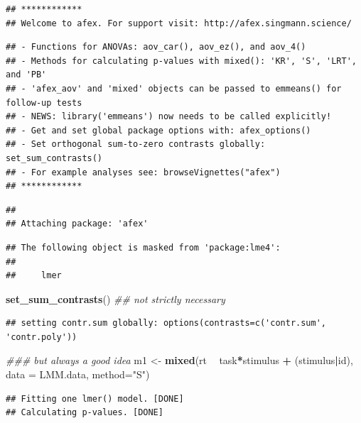 \documentclass[
]{book}
\newenvironment{Shaded}{\begin{snugshade}}{\end{snugshade}}
\newcommand{\CommentTok}[1]{\textcolor[rgb]{0.56,0.35,0.01}{\textit{#1}}}
\newcommand{\DataTypeTok}[1]{\textcolor[rgb]{0.13,0.29,0.53}{#1}}
\newcommand{\KeywordTok}[1]{\textcolor[rgb]{0.13,0.29,0.53}{\textbf{#1}}}
\newcommand{\NormalTok}[1]{#1}
\newcommand{\OperatorTok}[1]{\textcolor[rgb]{0.81,0.36,0.00}{\textbf{#1}}}
\newcommand{\StringTok}[1]{\textcolor[rgb]{0.31,0.60,0.02}{#1}}
\begin{document}
\begin{verbatim}
## ************
## Welcome to afex. For support visit: http://afex.singmann.science/
\end{verbatim}

\begin{verbatim}
## - Functions for ANOVAs: aov_car(), aov_ez(), and aov_4()
## - Methods for calculating p-values with mixed(): 'KR', 'S', 'LRT', and 'PB'
## - 'afex_aov' and 'mixed' objects can be passed to emmeans() for follow-up tests
## - NEWS: library('emmeans') now needs to be called explicitly!
## - Get and set global package options with: afex_options()
## - Set orthogonal sum-to-zero contrasts globally: set_sum_contrasts()
## - For example analyses see: browseVignettes("afex")
## ************
\end{verbatim}

\begin{verbatim}
## 
## Attaching package: 'afex'
\end{verbatim}

\begin{verbatim}
## The following object is masked from 'package:lme4':
## 
##     lmer
\end{verbatim}

\begin{Shaded}
\begin{Highlighting}[]
\KeywordTok{set_sum_contrasts}\NormalTok{() }\CommentTok{## not strictly necessary}
\end{Highlighting}
\end{Shaded}

\begin{verbatim}
## setting contr.sum globally: options(contrasts=c('contr.sum', 'contr.poly'))
\end{verbatim}

\begin{Shaded}
\begin{Highlighting}[]
\CommentTok{### but always a good idea}
\NormalTok{m1 <-}\StringTok{ }\KeywordTok{mixed}\NormalTok{(rt }\OperatorTok{~}\StringTok{ }\NormalTok{task}\OperatorTok{*}\NormalTok{stimulus }\OperatorTok{+}
\StringTok{              }\NormalTok{(stimulus}\OperatorTok{|}\NormalTok{id), }\DataTypeTok{data =}\NormalTok{ LMM.data, }\DataTypeTok{method=}\StringTok{"S"}\NormalTok{)}
\end{Highlighting}
\end{Shaded}

\begin{verbatim}
## Fitting one lmer() model. [DONE]
## Calculating p-values. [DONE]
\end{verbatim}
\end{document}
